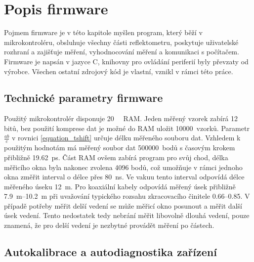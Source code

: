 \chapter{Popis firmware}

Pojmem firmware je v této kapitole myšlen program, který běží v mikrokontroléru, obsluhuje všechny části reflektometru, poskytuje uživatelské rozhraní a zajišťuje měření, vyhodnocování měření a komunikaci s počítačem. Firmware je napsán v jazyce C, knihovny pro ovládání periferií byly převzaty od výrobce. Všechen ostatní zdrojový kód je vlastní, vznikl v rámci této práce.

\section{Technické parametry firmware}
Použitý mikrokontrolér disponuje \SI{20}{\kilo\byte} \acrshort{RAM}. Jeden měřený vzorek zabírá 12 bitů, bez použití komprese dat je možné do \acrshort{RAM} uložit 10000~vzorků. Parametr $\frac{a b}{c}$ v rovnici \ref{equation_tshift} určuje délku měřeného souboru dat. Vzhledem k použitým hodnotám má měřený soubor dat 500000~bodů s časovým krokem přibližně \SI{19.62}{\pico\second}. Část RAM ovšem zabírá program pro svůj chod, délka měřicího okna byla nakonec zvolena 4096 bodů, což umožňuje v rámci jednoho okna změřit interval o délce přes \SI{80}{\nano\second}. Ve vakuu tento interval odpovídá délce měřeného úseku \SI{12}{\meter}. Pro koaxiální kabely odpovídá měřený úsek přibližně \SIrange{7.9}{10.2}{\meter} při uvažování typického rozsahu zkracovacího činitele \SIrange{0.66}{0.85}{}. V případě potřeby měřit delší vedení se může měřicí okno posunout a měřit další úsek vedení. Tento nedostatek tedy nebrání měřit libovolně dlouhá vedení, pouze znamená, že pro delší vedení je nezbytné provádět měření po částech.

\section{Autokalibrace a autodiagnostika zařízení}

